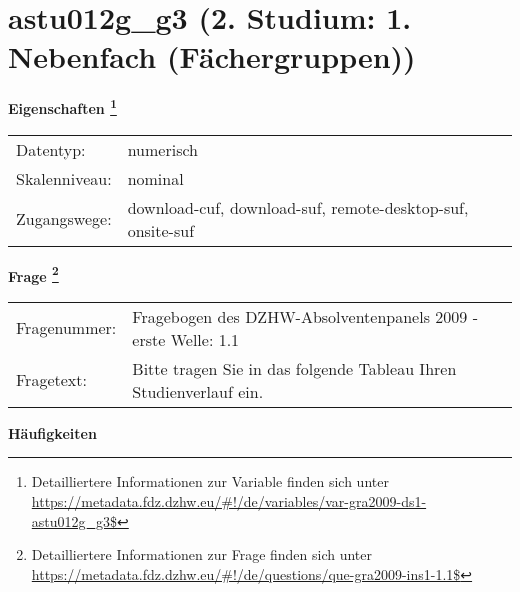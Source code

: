 
    \setcounter{footnote}{0}

    \vspace*{-1.8cm}
	\section{astu012g\_g3 (2. Studium: 1. Nebenfach (Fächergruppen))}
	\label{section:astu012g_g3}



    \vspace*{0.5cm}
    \noindent\textbf{Eigenschaften
	\footnote{Detailliertere Informationen zur Variable finden sich unter
		\url{https://metadata.fdz.dzhw.eu/\#!/de/variables/var-gra2009-ds1-astu012g_g3$}}}\\
	\begin{tabularx}{\hsize}{@{}lX}
	Datentyp: & numerisch \\
	Skalenniveau: & nominal \\
	Zugangswege: &
	  download-cuf, 
	  download-suf, 
	  remote-desktop-suf, 
	  onsite-suf
 \\
    \end{tabularx}



				\vspace*{0.5cm}
                \noindent\textbf{Frage
	                \footnote{Detailliertere Informationen zur Frage finden sich unter
		              \url{https://metadata.fdz.dzhw.eu/\#!/de/questions/que-gra2009-ins1-1.1$}}}\\
				\begin{tabularx}{\hsize}{@{}lX}
					Fragenummer: &
					  Fragebogen des DZHW-Absolventenpanels 2009 - erste Welle:
					  1.1
 \\
					Fragetext: & Bitte tragen Sie in das folgende Tableau Ihren Studienverlauf ein. \\
				\end{tabularx}





        		\vspace*{0.5cm}
                \noindent\textbf{Häufigkeiten}

